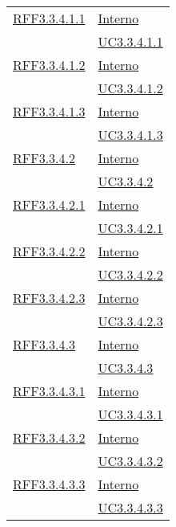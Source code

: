 \begin{longtable}{|>{\centering}m{5cm}|m{5cm}<{\centering}|}
\hyperlink{RFF3.3.4.1.1}{RFF3.3.4.1.1} & \hyperlink{Interno}{Interno}\\
& \hyperref[UC3.3.4.1.1]{UC3.3.4.1.1}\\ \hline

\hyperlink{RFF3.3.4.1.2}{RFF3.3.4.1.2} & \hyperlink{Interno}{Interno}\\
& \hyperref[UC3.3.4.1.2]{UC3.3.4.1.2}\\ \hline

\hyperlink{RFF3.3.4.1.3}{RFF3.3.4.1.3} & \hyperlink{Interno}{Interno}\\
& \hyperref[UC3.3.4.1.3]{UC3.3.4.1.3}\\ \hline

\hyperlink{RFF3.3.4.2}{RFF3.3.4.2} & \hyperlink{Interno}{Interno}\\
& \hyperref[UC3.3.4.2]{UC3.3.4.2}\\ \hline

\hyperlink{RFF3.3.4.2.1}{RFF3.3.4.2.1} & \hyperlink{Interno}{Interno}\\
& \hyperref[UC3.3.4.2.1]{UC3.3.4.2.1}\\ \hline

\hyperlink{RFF3.3.4.2.2}{RFF3.3.4.2.2} & \hyperlink{Interno}{Interno}\\
& \hyperref[UC3.3.4.2.2]{UC3.3.4.2.2}\\ \hline

\hyperlink{RFF3.3.4.2.3}{RFF3.3.4.2.3} & \hyperlink{Interno}{Interno}\\
& \hyperref[UC3.3.4.2.3]{UC3.3.4.2.3}\\ \hline

\hyperlink{RFF3.3.4.3}{RFF3.3.4.3} & \hyperlink{Interno}{Interno}\\
& \hyperref[UC3.3.4.3]{UC3.3.4.3}\\ \hline

\hyperlink{RFF3.3.4.3.1}{RFF3.3.4.3.1} & \hyperlink{Interno}{Interno}\\
& \hyperref[UC3.3.4.3.1]{UC3.3.4.3.1}\\ \hline

\hyperlink{RFF3.3.4.3.2}{RFF3.3.4.3.2} & \hyperlink{Interno}{Interno}\\
& \hyperref[UC3.3.4.3.2]{UC3.3.4.3.2}\\ \hline

\hyperlink{RFF3.3.4.3.3}{RFF3.3.4.3.3} & \hyperlink{Interno}{Interno}\\
& \hyperref[UC3.3.4.3.3]{UC3.3.4.3.3}\\ \hline


\end{longtable}
